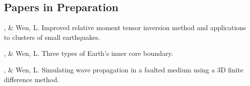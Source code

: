 \subsection*{Papers in Preparation}
\begin{etaremune}
\item
    \Tian, \& Wen, L.
    Improved relative moment tensor inversion method and applications to clusters of small earthquakes.
\item
    \Tian, \& Wen, L.
    Three types of Earth's inner core boundary.
\item
    \Tian, \& Wen, L.
    Simulating wave propagation in a faulted medium using a 3D finite difference method.
\end{etaremune}
